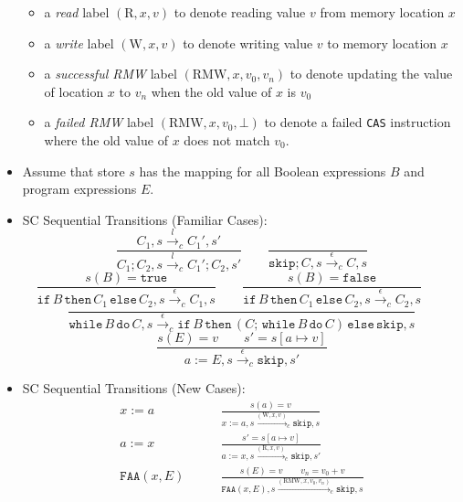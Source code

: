 \documentclass[twocolumn,landscape,10pt]{article}
\theoremstyle{definition}
\begin{document}
\begin{itemize}
\begin{itemize}
            \item a \emph{read} label $(\text{R},x,v)$ to denote reading value $v$ from
                memory location $x$
            \item a \emph{write} label $(\text{W},x,v)$ to denote writing value $v$ to
                memory location $x$
            \item a \emph{successful RMW} label $(\text{RMW},x,v_0,v_n)$ to
                denote updating the value of location $x$ to $v_n$ when the old
                value of $x$ is $v_0$
            \item a \emph{failed RMW} label $(\text{RMW},x,v_0,\bot)$ to denote
                a failed \texttt{CAS} instruction where the old value of $x$
                does not match $v_0$.
        \end{itemize} 
    \item Assume that store $s$ has the mapping for all Boolean expressions $B$
        and program expressions $E$.
    \item SC Sequential Transitions (Familiar Cases):
        \[
            \frac{C_1,s\xrightarrow{l}_c C_1',s'}{C_1;C_2,s\xrightarrow{l}_c
            C_1';C_2,s'} \qquad
            \frac{}{\texttt{skip};C,s\xrightarrow{\epsilon}_c C,s}
        \]
        \[
            \frac{s(B)=\texttt{true}}{\texttt{if}\,B\,\texttt{then}\,C_1\,\texttt{else}\,C_2,s\xrightarrow{\epsilon}_c
            C_1,s} \qquad
            \frac{s(B)=\texttt{false}}{\texttt{if}\,B\,\texttt{then}\,C_1\,\texttt{else}\,C_2,s\xrightarrow{\epsilon}_c
            C_2,s} \qquad
        \]
        \[
            \frac{}{\texttt{while}\,B\,\texttt{do}\,C,s\xrightarrow{\epsilon}_c
            \texttt{if}\,B\,\texttt{then}\,(C;\,\texttt{while}\,B\,\texttt{do}\,C)\,
            \texttt{else}\,\texttt{skip}, s}
        \]
        \[
            \frac{s(E)=v\qquad s'=s[a\mapsto
            v]}{a:=E,s\xrightarrow{\epsilon}_c\texttt{skip},s'}
        \]
    \item SC Sequential Transitions (New Cases):
        \begin{align*}
            x:=a\qquad& \frac{s(a)=v}
            {x:=a,s\xrightarrow{(\text{W},x,v)}_c\texttt{skip},s} \\[0.5em]
            a:=x\qquad& \frac{s'=s[a\mapsto v]}
            {a:=x,s\xrightarrow{(\text{R},x,v)}_c\texttt{skip},s'} \\[0.5em]
            \texttt{FAA}(x,E)\qquad& \frac{s(E)=v\qquad v_n=v_0+v}
            {\texttt{FAA}(x,E),s\xrightarrow{(\text{RMW},x,v_0,v_n)}_c\texttt{skip},s}\\[0.5em]

\end{align*}
\end{itemize}
\end{document}

